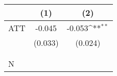 {
\def\sym#1{\ifmmode^{#1}\else\(^{#1}\)\fi}
\begin{tabular}{l*{2}{c}}
\hline\hline
                    &         (1)         &         (2)         \\
\hline
ATT                 &      -0.045         &      -0.053\sym{**} \\
                    &     (0.033)         &     (0.024)         \\
                    &                     &                     \\
                    &                     &                     \\
\hline
N                   &                     &                     \\
\hline\hline
\end{tabular}
}
